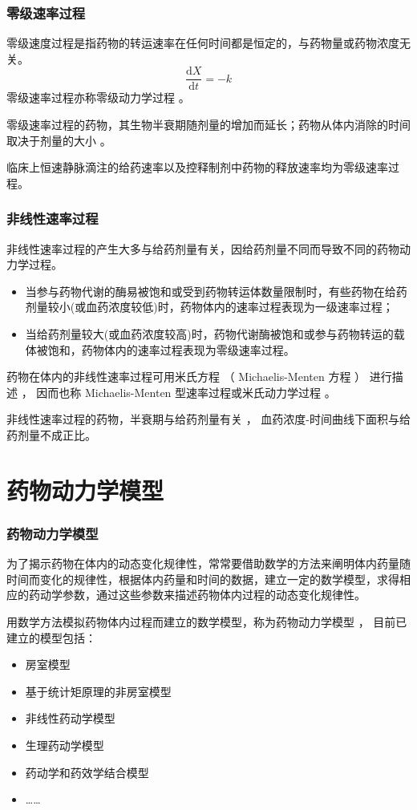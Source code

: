 \documentclass[dvipsnames, svgnames, x11names]{beamer}
\begin{document}
\begin{frame}
	\frametitle{零级速率过程}
	零级速度过程是指药物的转运速率在任何时间都是恒定的，与药物量或药物浓度无关。
	\[
		\frac{\mathrm{d}X}{\mathrm{d}t}=-k
	\]
	零级速率过程亦称零级动力学过程 。
	
	零级速率过程的药物，其生物半衰期随剂量的增加而延长；药物从体内消除的时间取决于剂量的大小 。
	\begin{blankblock}{}
		临床上恒速静脉滴注的给药速率以及控释制剂中药物的释放速率均为零级速率过程。
	\end{blankblock}
\end{frame}


\begin{frame}
	\frametitle{非线性速率过程}
	非线性速率过程的产生大多与给药剂量有关，因给药剂量不同而导致不同的药物动力学过程。
	\begin{itemize}
	  \item 当参与药物代谢的酶易被饱和或受到药物转运体数量限制时，有些药物在给药剂量较小(或血药浓度较低)时，药物体内的速率过程表现为一级速率过程；
	  \item 当给药剂量较大(或血药浓度较高)时，药物代谢酶被饱和或参与药物转运的载体被饱和，药物体内的速率过程表现为零级速率过程。
	\end{itemize}
	药物在体内的非线性速率过程可用米氏方程 （ Michaelis-Menten 方程 ） 进行描述 ， 因而也称 Michaelis-Menten 型速率过程或米氏动力学过程 。

	非线性速率过程的药物，半衰期与给药剂量有关 ， 血药浓度-时间曲线下面积与给药剂量不成正比。 
\end{frame}


\section{药物动力学模型}


\begin{frame}
	\frametitle{药物动力学模型}
	为了揭示药物在体内的动态变化规律性，常常要借助数学的方法来阐明体内药量随时间而变化的规律性，根据体内药量和时间的数据，建立一定的数学模型，求得相应的药动学参数，通过这些参数来描述药物体内过程的动态变化规律性。
	
	用数学方法模拟药物体内过程而建立的数学模型，称为药物动力学模型 ， 目前已建立的模型包括：
	\begin{itemize}
	  \item 房室模型
	  \item 基于统计矩原理的非房室模型
	  \item 非线性药动学模型
	  \item 生理药动学模型
	  \item 药动学和药效学结合模型
	  \item ……
	\end{itemize}
\end{frame}
\end{document}
